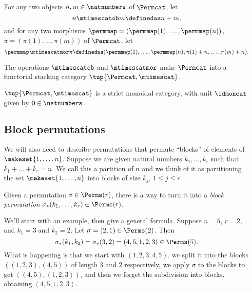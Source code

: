 \begin{definition}\label{def:Permcat-1}
    For any two objects $n, m \in \natnumbers$ of $\Permcat$, let
    \begin{equation}
        n \mtimescatob m \definedas n + m,
    \end{equation}
    and for any two morphisms $\permmap = (\permmap(1), \dots, \permmap(n))$, $\pi = (\pi(1), \dots, \pi(m))$ of $\Permcat$, let
    \begin{equation}
        \permmap \mtimescatmor \pi \definedas (\permmap(1), \dots, \permmap(n), \pi(1) + n, \dots, \pi(m) + n).
    \end{equation}
\end{definition}

\begin{lemma}
    The operations $\mtimescatob$ and $\mtimescatmor$ make $\Permcat$ into a functorial stacking category $\tup{\Permcat, \mtimescat}$.
\end{lemma}


\begin{lemma}
    $\tup{\Permcat, \mtimescat}$ is a strict monoidal category, with unit $\idmoncat$ given by $0 \in \natnumbers$.
\end{lemma}


\subsection{Block permutations}

We will also need to describe permutations that permute ``blocks'' of elements of $\makeset{1, \dots, n}$.
Suppose we are given natural numbers $k_1, \dots, k_r$ such that $k_1 + \dots + k_r = n$.
We call this a partition of $n$ and we think of it as partitioning the set $\makeset{1, \dots, n}$ into blocks of size $k_j$, $1 \leq j \leq r$.

Given a permutation $\sigma \in \Perms(r)$, there is a way to turn it into a \emph{block permutation} $\sigma_*(k_1, \dots, k_r) \in \Perms(r)$.

We'll start with an example, then give a general formula.
Suppose $n = 5$, $r=2$, and $k_1 = 3$ and $k_2 = 2$.
Let $\sigma = (2, 1) \in \Perms(2)$.
Then
$$
    \sigma_*(k_1, k_2) = \sigma_*(3,2) = (4,5,1,2,3) \in \Perms(5).
$$
What is happening is that we start with $(1,2,3,4,5)$, we split it into the blocks $((1,2,3),(4,5))$ of length $3$ and $2$ respectively, we apply $\sigma$ to the blocks to get $((4,5),(1,2,3))$, and then we forget the subdivision into blocks, obtaining $(4,5,1,2,3)$.

